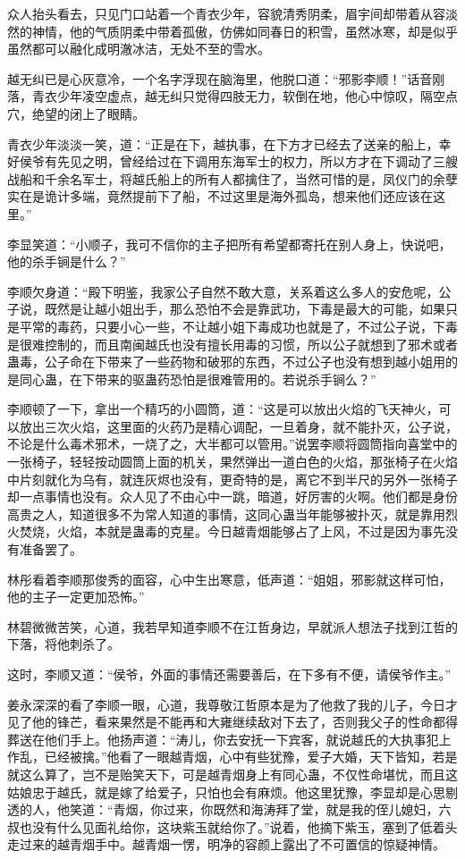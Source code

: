 众人抬头看去，只见门口站着一个青衣少年，容貌清秀阴柔，眉宇间却带着从容淡然的神情，他的气质阴柔中带着孤傲，仿佛如同春日的积雪，虽然冰寒，却是似乎虽然都可以融化成明澈冰洁，无处不至的雪水。

越无纠已是心灰意冷，一个名字浮现在脑海里，他脱口道：“邪影李顺！”话音刚落，青衣少年凌空虚点，越无纠只觉得四肢无力，软倒在地，他心中惊叹，隔空点穴，绝望的闭上了眼睛。

青衣少年淡淡一笑，道：“正是在下，越执事，在下方才已经去了送亲的船上，幸好侯爷有先见之明，曾经给过在下调用东海军士的权力，所以方才在下调动了三艘战船和千余名军士，将越氏船上的所有人都擒住了，当然可惜的是，凤仪门的余孽实在是诡计多端，竟然提前下了船，不过这里是海外孤岛，想来他们还应该在这里。”

李显笑道：“小顺子，我可不信你的主子把所有希望都寄托在别人身上，快说吧，他的杀手锏是什么？”

李顺欠身道：“殿下明鉴，我家公子自然不敢大意，关系着这么多人的安危呢，公子说，既然是让越小姐出手，那么恐怕不会是靠武功，下毒是最大的可能，如果只是平常的毒药，只要小心一些，不让越小姐下毒成功也就是了，不过公子说，下毒是很难控制的，而且南闽越氏也没有擅长用毒的习惯，所以公子就想到了邪术或者蛊毒，公子命在下带来了一些药物和破邪的东西，不过公子也没有想到越小姐用的是同心蛊，在下带来的驱蛊药恐怕是很难管用的。若说杀手锏么？”

李顺顿了一下，拿出一个精巧的小圆筒，道：“这是可以放出火焰的飞天神火，可以放出三次火焰，这里面的火药乃是精心调配，一旦着身，就不能扑灭，公子说，不论是什么毒术邪术，一烧了之，大半都可以管用。”说罢李顺将圆筒指向喜堂中的一张椅子，轻轻按动圆筒上面的机关，果然弹出一道白色的火焰，那张椅子在火焰中片刻就化为乌有，就连灰烬也没有，更奇特的是，离它不到半尺的另外一张椅子却一点事情也没有。众人见了不由心中一跳，暗道，好厉害的火啊。他们都是身份高贵之人，知道很多不为常人知道的事情，这同心蛊当年能够被扑灭，就是靠用烈火焚烧，火焰，本就是蛊毒的克星。今日越青烟能够占了上风，不过是因为事先没有准备罢了。

林彤看着李顺那俊秀的面容，心中生出寒意，低声道：“姐姐，邪影就这样可怕，他的主子一定更加恐怖。”

林碧微微苦笑，心道，我若早知道李顺不在江哲身边，早就派人想法子找到江哲的下落，将他刺杀了。

这时，李顺又道：“侯爷，外面的事情还需要善后，在下多有不便，请侯爷作主。”

姜永深深的看了李顺一眼，心道，我尊敬江哲原本是为了他救了我的儿子，今日才见了他的锋芒，看来果然是不能再和大雍继续敌对下去了，否则我父子的性命都得葬送在他们手上。他扬声道：“涛儿，你去安抚一下宾客，就说越氏的大执事犯上作乱，已经被擒。”他看了一眼越青烟，心中有些犹豫，爱子大婚，天下皆知，若是就这么算了，岂不是贻笑天下，可是越青烟身上有同心蛊，不仅性命堪忧，而且这姑娘忠于越氏，就是嫁了给爱子，只怕也会有麻烦。他这里犹豫，李显却是心思剔透的人，他笑道：“青烟，你过来，你既然和海涛拜了堂，就是我的侄儿媳妇，六叔也没有什么见面礼给你，这块紫玉就给你了。”说着，他摘下紫玉，塞到了低着头走过来的越青烟手中。越青烟一愣，明净的容颜上露出了不可置信的惊疑神情。

